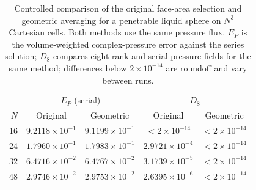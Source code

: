 \begin{table}[htbp]
\centering
\small
\setlength{\tabcolsep}{5pt}
\begin{tabular}{rcccc}
\toprule
& \multicolumn{2}{c}{$E_P$ (serial)} & \multicolumn{2}{c}{$D_8$} \\
$N$ & Original & Geometric & Original & Geometric \\
\midrule
16 & $9.2118\times10^{-1}$ & $9.1199\times10^{-1}$ & $<2\times10^{-14}$ & $<2\times10^{-14}$ \\
24 & $1.7960\times10^{-1}$ & $1.7983\times10^{-1}$ & $2.9721\times10^{-4}$ & $<2\times10^{-14}$ \\
32 & $6.4716\times10^{-2}$ & $6.4767\times10^{-2}$ & $3.1739\times10^{-5}$ & $<2\times10^{-14}$ \\
48 & $2.9746\times10^{-2}$ & $2.9753\times10^{-2}$ & $2.6395\times10^{-6}$ & $<2\times10^{-14}$ \\
\bottomrule
\end{tabular}
\caption{Controlled comparison of the original face-area selection and
geometric averaging for a penetrable liquid sphere on $N^3$ Cartesian cells.
Both methods use the same pressure flux. $E_P$ is the volume-weighted
complex-pressure error against the series solution; $D_8$ compares eight-rank
and serial pressure fields for the same method; differences below
$2\times10^{-14}$ are roundoff and vary between runs.}
\label{tab:geometricComparison}
\end{table}
